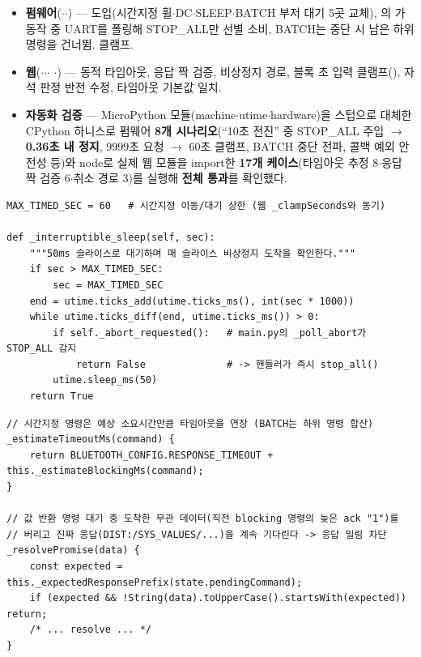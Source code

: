 \begin{itemize}
  \item \textbf{펌웨어}($\cdot$$\cdot$) —
   도입(시간지정 휠$\cdot$DC$\cdot$SLEEP$\cdot$BATCH 부저 대기 5곳 교체),
  의 가 동작 중 UART를 폴링해 STOP\_ALL만 선별 소비,
  BATCH는 중단 시 남은 하위 명령을 건너뜀.  클램프.
  \item \textbf{웹}($\cdot$$\cdot$$\cdot$%
  $\cdot$) —  동적 타임아웃,
   응답 짝 검증,  비상정지 경로,
  블록 초 입력 클램프(), 자석 판정 반전 수정, 타임아웃 기본값 일치.
  \item \textbf{자동화 검증} — MicroPython 모듈(machine$\cdot$utime$\cdot$hardware)을 스텁으로 대체한
  CPython 하니스로 펌웨어 \textbf{8개 시나리오}(``10초 전진'' 중 STOP\_ALL 주입 $\to$
  \textbf{0.36초 내 정지}, 9999초 요청 $\to$ 60초 클램프, BATCH 중단 전파, 콜백 예외 안전성 등)와
  node로 실제 웹 모듈을 import한 \textbf{17개 케이스}(타임아웃 추정 8$\cdot$응답 짝 검증 6$\cdot$취소
  경로 3)를 실행해 \textbf{전체 통과}를 확인했다.
\end{itemize}

\begin{verbatim}
MAX_TIMED_SEC = 60   # 시간지정 이동/대기 상한 (웹 _clampSeconds와 동기)

def _interruptible_sleep(self, sec):
    """50ms 슬라이스로 대기하며 매 슬라이스 비상정지 도착을 확인한다."""
    if sec > MAX_TIMED_SEC:
        sec = MAX_TIMED_SEC
    end = utime.ticks_add(utime.ticks_ms(), int(sec * 1000))
    while utime.ticks_diff(end, utime.ticks_ms()) > 0:
        if self._abort_requested():   # main.py의 _poll_abort가 STOP_ALL 감지
            return False              # -> 핸들러가 즉시 stop_all()
        utime.sleep_ms(50)
    return True
\end{verbatim}

\begin{verbatim}
// 시간지정 명령은 예상 소요시간만큼 타임아웃을 연장 (BATCH는 하위 명령 합산)
_estimateTimeoutMs(command) {
    return BLUETOOTH_CONFIG.RESPONSE_TIMEOUT + this._estimateBlockingMs(command);
}

// 값 반환 명령 대기 중 도착한 무관 데이터(직전 blocking 명령의 늦은 ack "1")를
// 버리고 진짜 응답(DIST:/SYS_VALUES/...)을 계속 기다린다 -> 응답 밀림 차단
_resolvePromise(data) {
    const expected = this._expectedResponsePrefix(state.pendingCommand);
    if (expected && !String(data).toUpperCase().startsWith(expected)) return;
    /* ... resolve ... */
}
\end{verbatim}

